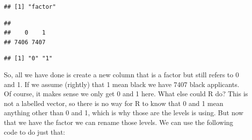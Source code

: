 \documentclass[]{book}
\newenvironment{Shaded}{\begin{snugshade}}{\end{snugshade}}
\newcommand{\CommentTok}[1]{\textcolor[rgb]{0.56,0.35,0.01}{\textit{#1}}}
\newcommand{\KeywordTok}[1]{\textcolor[rgb]{0.13,0.29,0.53}{\textbf{#1}}}
\newcommand{\NormalTok}[1]{#1}
\newcommand{\OperatorTok}[1]{\textcolor[rgb]{0.81,0.36,0.00}{\textbf{#1}}}
\newcommand{\StringTok}[1]{\textcolor[rgb]{0.31,0.60,0.02}{#1}}
\theoremstyle{definition}
\theoremstyle{definition}
\theoremstyle{definition}
\theoremstyle{remark}
\begin{document}
\begin{Shaded}
\end{Shaded}

\begin{verbatim}
## [1] "factor"
\end{verbatim}

\begin{Shaded}
\end{Shaded}

\begin{verbatim}
## 
##    0    1 
## 7406 7407
\end{verbatim}

\begin{Shaded}
\end{Shaded}

\begin{verbatim}
## [1] "0" "1"
\end{verbatim}

So, all we have done is create a new column that is a factor but still
refers to 0 and 1. If we assume (rightly) that 1 mean black we have 7407
black applicants. Of course, it makes sense we only get 0 and 1 here.
What else could R do? This is not a labelled vector, so there is no way
for R to know that 0 and 1 mean anything other than 0 and 1, which is
why those are the levels is using. But now that we have the factor we
can rename those levels. We can use the following code to do just that:
\end{document}
